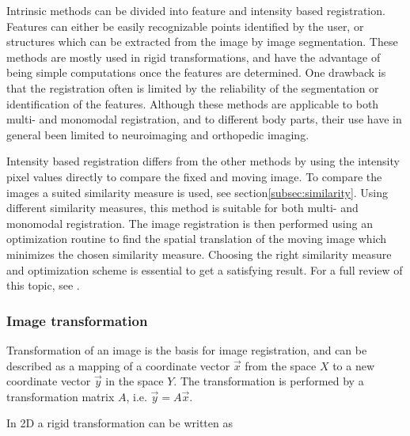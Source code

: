 Intrinsic methods can be divided into feature and intensity based registration. Features can either be easily recognizable points identified by the user, or structures which can be extracted from the image by image segmentation. These methods are mostly used in rigid transformations, and have the advantage of being simple computations once the features are determined. One drawback is that the registration often is limited by the reliability of the segmentation or identification of the features. Although these methods are applicable to both multi- and monomodal registration, and to different body parts, their use have in general been limited to neuroimaging and orthopedic imaging\cite{Maintz1998}.

Intensity based registration differs from the other methods by using the intensity pixel values directly to compare the fixed and moving image. To compare the images a suited similarity measure is used, see section\ref{subsec:similarity}. Using different similarity measures, this method is suitable for both multi- and monomodal registration. The image registration is then performed using an optimization routine to find the spatial translation of the moving image which minimizes the chosen similarity measure. Choosing the right similarity measure and optimization scheme is essential to get a satisfying result. For a full review of this topic, see \cite{Maintz1998}.

%

\subsubsection{Image transformation}

Transformation of an image is the basis for image registration, and can be described as a mapping of a coordinate vector $\vec{x}$ from the space $X$ to a new coordinate vector $\vec{y}$ in the space $Y$. The transformation is performed by a transformation matrix $A$, i.e. $\vec{y} = A\vec{x}$.

In 2D a rigid transformation can be written as 

